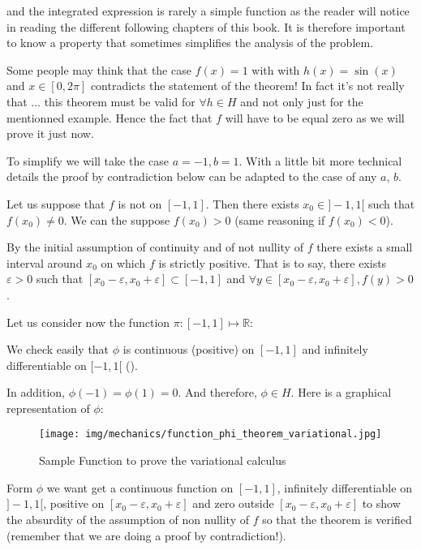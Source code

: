 	and the integrated expression is rarely a simple function as the reader will notice in reading the different following chapters of this book. It is therefore important to know a property that sometimes simplifies the analysis of the problem. 
	
	\begin{tcolorbox}[title=Remark,colframe=black,arc=10pt]
	Some people may think that the case $f(x)=1$ with with $h(x)=\sin(x)$ and $x\in[0,2\pi]$ contradicts the statement of the theorem! In fact it's not really that ... this theorem must be valid for $\forall h\in H$ and not only just for the mentionned example. Hence the fact that $f$ will have to be equal zero as we will prove it just now.
	\end{tcolorbox}
	\begin{dem}
	To simplify we will take the case $a=-1,b=1$. With a little bit more technical details the proof by contradiction below can be adapted to the case of any $a$, $b$.
	
	Let us suppose that $f$ is not on $[-1,1]$. Then there exists $x_0\in ]-1,1[$ such that $f(x_0)\neq 0$. We can the suppose $f(x_0)>0$ (same reasoning if $f(x_0)<0$).
	
	By the initial assumption of continuity and of not nullity of $f$ there exists a small interval around $x_0$ on which $f$ is strictly positive. That is to say, there exists $\varepsilon >0$ such that $[x_0-\varepsilon,x_0+\varepsilon]\subset [-1,1]$ and $\forall y\in[x_0-\varepsilon,x_0+\varepsilon],f(y)>0$.
	
	Let us consider now the function $\pi:[-1,1]\mapsto \mathbb{R}$:
	
	We check easily that $\phi$ is continuous (positive) on $[-1,1]$ and infinitely differentiable on $[-1,1[$ ().
	
	In addition, $\phi(-1)=\phi(1)=0$. And therefore, $\phi\in H$. Here is a graphical representation of $\phi$:
	\begin{figure}[H]
		\centering
		\texttt{[image: img/mechanics/function\_phi\_theorem\_variational.jpg]}
		\caption[]{Sample Function to prove the variational calculus}
	\end{figure}
	Form $\phi$ we want get a continuous function on $[-1,1]$, infinitely differentiable on $]-1,1[$, positive on $[x_0-\varepsilon,x_0+\varepsilon]$ and zero outside $[x_0-\varepsilon,x_0+\varepsilon]$ to show the absurdity of the assumption of non nullity of $f$ so that the theorem is verified (remember that we are doing a proof by contradiction!).


\end{dem}
